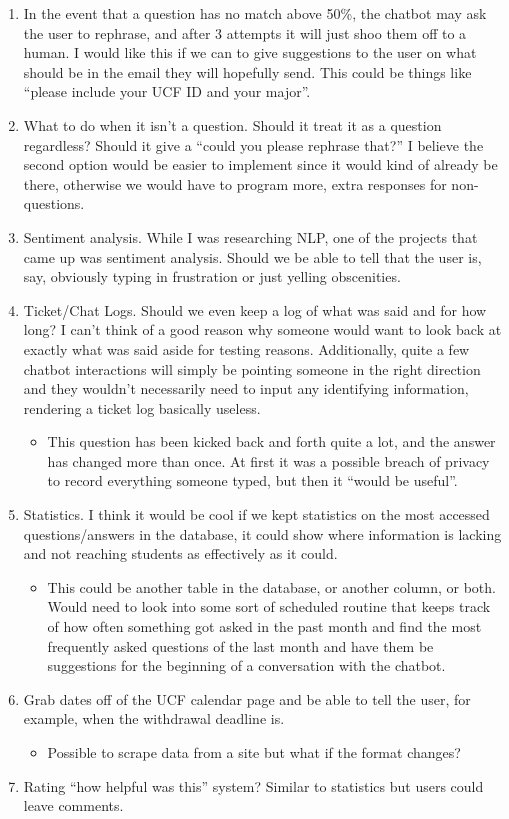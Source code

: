 \documentclass[titlepage, 12pt]{article}
\begin{document}
\begin{enumerate}
\begin{itemize}
    \end{itemize}
    \item In the event that a question has no match above 50\%, the chatbot may ask the user to rephrase, and after 3 attempts it will just shoo them off to a human. I would like this if we can to give suggestions to the user on what should be in the email they will hopefully send. This could be things like “please include your UCF ID and your major”.
    \item What to do when it isn’t a question. Should it treat it as a question regardless? Should it give a “could you please rephrase that?” I believe the second option would be easier to implement since it would kind of already be there, otherwise we would have to program more, extra responses for non-questions. 
    \item Sentiment analysis. While I was researching NLP, one of the projects that came up was sentiment analysis. Should we be able to tell that the user is, say, obviously typing in frustration or just yelling obscenities.
    \item Ticket/Chat Logs. Should we even keep a log of what was said and for how long? I can’t think of a good reason why someone would want to look back at exactly what was said aside for testing reasons. Additionally, quite a few chatbot interactions will simply be pointing someone in the right direction and they wouldn’t necessarily need to input any identifying information, rendering a ticket log basically useless. 
    \begin{itemize}
        \item This question has been kicked back and forth quite a lot, and the answer has changed more than once. At first it was a possible breach of privacy to record everything someone typed, but then it “would be useful”.
    \end{itemize}
    \item Statistics. I think it would be cool if we kept statistics on the most accessed questions/answers in the database, it could show where information is lacking and not reaching students as effectively as it could.
    \begin{itemize}
        \item This could be another table in the database, or another column, or both. Would need to look into some sort of scheduled routine that keeps track of how often something got asked in the past month and find the most frequently asked questions of the last month and have them be suggestions for the beginning of a conversation with the chatbot.
    \end{itemize}
    \item Grab dates off of the UCF calendar page and be able to tell the user, for example, when the withdrawal deadline is.
    \begin{itemize}
        \item Possible to scrape data from a site but what if the format changes?
    \end{itemize}
    \item Rating “how helpful was this” system? Similar to statistics but users could leave comments.
\end{enumerate}
\end{document}
